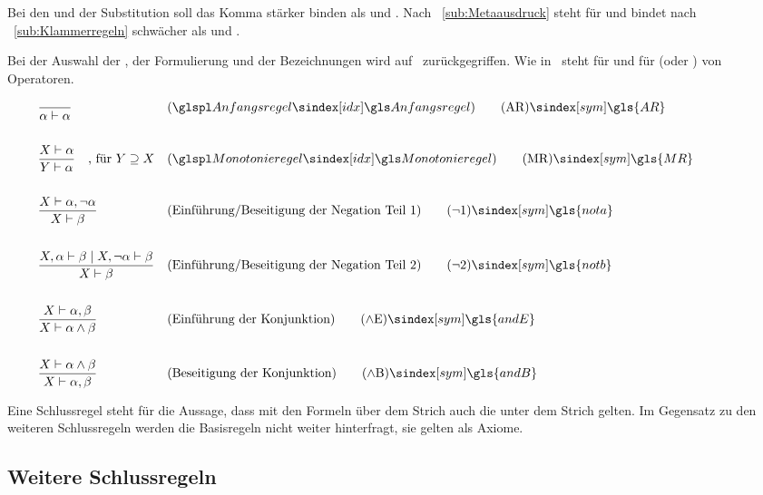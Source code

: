Bei den  und der Substitution soll das Komma stärker binden als \symqt{$\abltb$} und \symqt{$\subst$}.
Nach \subsectionname~\vref{sub:Metaausdruck} steht \symqt{$\mid$} für  \textbzw {}
und bindet nach \subsectionname~\vref{sub:Klammerregeln} schwächer als \symqt{$\abltb$} und \symqt{$\subst$}.

Bei der Auswahl der , der Formulierung und der Bezeichnungen wird auf~\cite{bib:Rautenberg,bib:NatuerlichesSchliessen} zurückgegriffen.
Wie in~\cite{bib:NatuerlichesSchliessen} steht  für  und  für  (oder ) von Operatoren.

\begin{align}
	& & & \frac{}{\alpha\abltb\alpha}
	& & (\glsIdxPl{Anfangsregel})
	\tag{\tagAR} \sym{\gls{AR}} \label{def:Anfangsregel}
	\\\\
	& & & \frac{X\abltb\alpha}{Y\abltb\alpha}
	\quad \text{, für } Y \supseteq X
	& & (\glsIdxPl{Monotonieregel})
	\tag{\tagMR} \sym{\gls{MR}} \label{def:Monotonieregel}
	\\\\
	& & & \frac{X\abltb\alpha,\lnot\alpha}{X\abltb\beta}
	& & (\text{Einführung/Beseitigung der Negation Teil 1})
	\tag{\tagnota} \sym{\gls{nota}} \label{def:nota}
	\\\\
	& & & \frac{X,\alpha\abltb\beta \mid X,\lnot\alpha\abltb\beta} {X\abltb\beta}
	& & (\text{Einführung/Beseitigung der Negation Teil 2})
	\tag{\tagnotb} \sym{\gls{notb}} \label{def:notb}
	\\\\
	& & & \frac{X\abltb\alpha,\beta}{X\abltb\alpha\land\beta}
	& & (\text{Einführung der Konjunktion})
	\tag{\tagandE} \sym{\gls{andE}} \label{def:andE}
	\\\\
	& & & \frac{X\abltb\alpha\land\beta}{X\abltb\alpha,\beta}
	& & (\text{Beseitigung der Konjunktion})
	\tag{\tagandB} \sym{\gls{andB}} \label{def:andB}
	\formulatoleft
\end{align}

Eine Schlussregel steht für die Aussage, dass mit den Formeln über dem Strich auch die unter dem Strich gelten.
Im Gegensatz zu den weiteren Schlussregeln werden die Basisregeln nicht weiter hinterfragt, \textdh sie gelten als Axiome.

\subsection{Weitere Schlussregeln}%
\label{sub:Schlussregeln}

